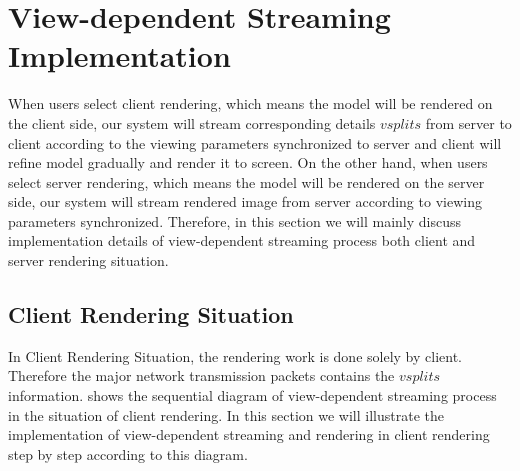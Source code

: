 \section{View-dependent Streaming Implementation}
\label{section:vdstreamingimpl}
When users select client rendering, which means the model will be rendered on the client side, our system will stream corresponding details $vsplits$ from server to client according to the viewing parameters synchronized to server and client will refine model gradually and render it to screen. On the other hand, when users select server rendering, which means the model will be rendered on the server side, our system will stream rendered image from server according to viewing parameters synchronized. Therefore, in this section we will mainly discuss implementation details of view-dependent streaming process both client and server rendering situation. 
\subsection{Client Rendering Situation}
\label{section:clientrenderingvdpm}

In Client Rendering Situation, the rendering work is done solely by client. Therefore the major network transmission packets contains the $vsplits$ information.  shows the sequential diagram of view-dependent streaming process in the situation of client rendering. In this section we will illustrate the implementation of view-dependent streaming and rendering in client rendering step by step according to this diagram. \\

